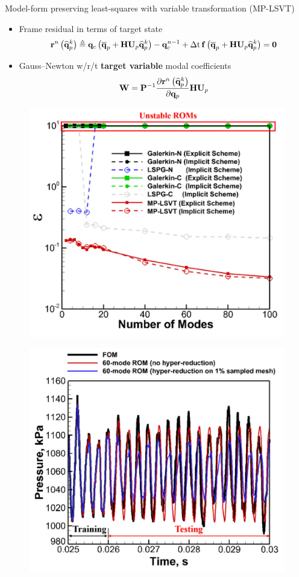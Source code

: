 \documentclass[]{beamer}
\begin{document}
\begin{frame}{\small{Model-form preserving least-squares with variable transformation (MP-LSVT)\footnotemark[6]}}
	\begin{itemize}
		\item Frame residual in terms of target state
		\begin{equation*}
			\resFuncIter{\timeIdx}{\primVecCoef^{\newtonIdx}} \triangleq \consFunc{\primVecCent + \primScale \primTrial \primVecCoef^{\newtonIdx}} - \consVec^{\timeIdx-1} + \dt \, \rhsFunc{\primVecCent + \primScale \primTrial \primVecCoef^{\newtonIdx}} = \zeroVec
		\end{equation*}
		\item Gauss--Newton w/r/t \textbf{target variable} modal coefficients
		\begin{equation*}
			\testBasis = \consScaleInv \pde{\resFuncIter{\timeIdx}{\primVecCoef^{\newtonIdx}}}{\primVec} \primScale \primTrial
		\end{equation*}
	\end{itemize}
	\begin{minipage}{0.49\linewidth}
		\centering
		\begin{figure}
			\includegraphics[width=0.75\linewidth]{theory/mplsvt_err_vs_modes.png}
		\end{figure}
	\end{minipage}
	\begin{minipage}{0.49\linewidth}
		\centering
		\begin{figure}
			\includegraphics[width=0.75\linewidth]{theory/mplsvt_pressure_probe.png}

\end{figure}
\end{minipage}
\end{frame}
\end{document}
